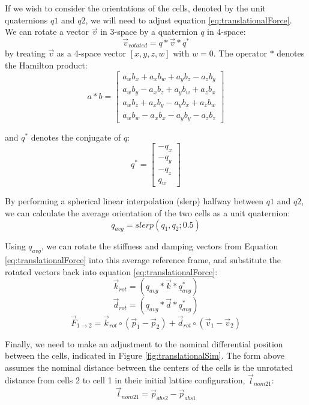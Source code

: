 {If we wish to consider the orientations of the cells, denoted by the unit quaternions $q1$ and $q2$, we will need to adjust equation \ref{eq:translationalForce}. \\
  
  We can rotate a vector $\vec{v}$ in 3-space by a quaternion $q$ in 4-space:
    \[ \vec{v}_{rotated} = q*\vec{v}*q^* \]
  by treating $\vec{v}$ as a 4-space vector $[x, y, z, w]$ with $w=0$.  The operator $*$ denotes the Hamilton product:
  \[ a*b =  \left[ \begin{array}{ccc}
a_wb_x + a_xb_w + a_yb_z - a_zb_y\\
a_wb_y - a_xb_z + a_yb_w + a_zb_x\\
a_wb_z + a_xb_y - a_yb_x + a_zb_w\\
a_wb_w - a_xb_x - a_yb_y - a_zb_z
 \end{array} \right] \] 
 
   and $q^*$ denotes the conjugate of $q$:
    \[ q^{*} =  \left[ \begin{array}{ccc}
-q_x\\
-q_y\\
-q_z\\
q_w
 \end{array} \right] \] 
 
By performing a spherical linear interpolation (slerp) halfway between $q1$ and $q2$, we can calculate the average orientation of the two cells as a unit quaternion:
  \[ q_{avg} = slerp(q_{1}, q_{2}; 0.5) \]
  
Using $q_{avg}$, we can rotate the stiffness and damping vectors from Equation \ref{eq:translationalForce} into this average reference frame, and substitute the rotated vectors back into equation \ref{eq:translationalForce}:
 \[ \vec{k}_{rot} = (q_{avg}*\vec{k}*q_{avg}^*)\]
  \[ \vec{d}_{rot} = (q_{avg}*\vec{d}*q_{avg}^*)\]
  \begin{equation} \label{eq:translationalForceRotStep}
 \vec{F}_{1\rightarrow2} = \vec{k}_{rot} \circ (\vec{p}_1 - \vec{p}_2) + \vec{d}_{rot} \circ (\vec{v}_1 - \vec{v}_2)
 \end{equation}
 
Finally, we need to make an adjustment to the nominal differential position between the cells, indicated in Figure \ref{fig:translationalSim}.  The form above assumes the nominal distance between the centers of the cells is the unrotated distance from cells 2 to cell 1 in their initial lattice configuration, $\vec{l}_{nom21}$:
 \[\vec{l}_{nom21} = \vec{p}_{abs2}-\vec{p}_{abs1}\]
 
}
